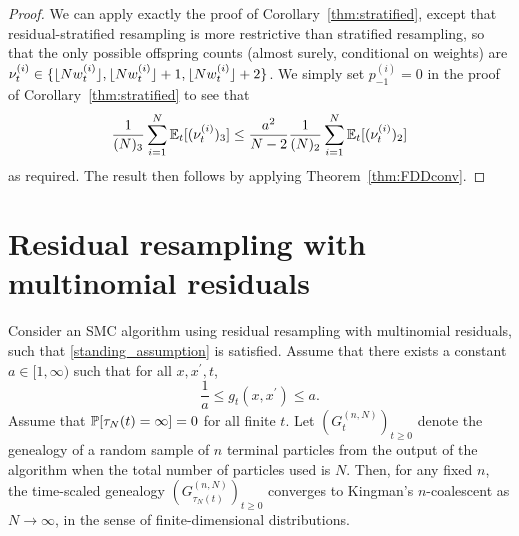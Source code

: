 \begin{proof}
We can apply exactly the proof of Corollary~\ref{thm:stratified}, except that residual-stratified resampling is more restrictive than stratified resampling, so that the only possible offspring counts (almost surely, conditional on weights) are $\nu_t^{(i)} \in \{ \lfloor N w_t^{(i)} \rfloor, \lfloor N w_t^{(i)} \rfloor +1, \lfloor N w_t^{(i)} \rfloor +2 \}$. We simply set $p_{-1}^{(i)} = 0$ in the proof of Corollary~\ref{thm:stratified} to see that
\begin{equation*}
\frac{1}{(N)_3} \sum_{i=1}^{N} \mathbb{E}_t [(\nu_t^{(i)})_3 ]
\leq \frac{a^2}{N-2} \frac{1}{(N)_2} \sum_{i=1}^{N} \mathbb{E}_t [(\nu_t^{(i)})_2 ]
\end{equation*}
as required.
The result then follows by applying Theorem~\ref{thm:FDDconv}.
\end{proof}






\section{Residual resampling with multinomial residuals \seb{$\sim$} }

\begin{corollary}\label{thm:residual_multinomial}
Consider an SMC algorithm using residual resampling with multinomial residuals, such that \ref{standing_assumption} is satisfied.
Assume that there exists a constant $a\in [1,\infty)$ such that for all $x, x^\prime, t$,
\begin{equation*}
\frac{1}{a} \leq g_t(x, x^\prime) \leq a .
\end{equation*}
Assume that $\mathbb{P}[ \tau_N(t) = \infty] =0$ for all finite $t$.
Let $(G_t^{(n,N)})_{t\geq0}$ denote the genealogy of a random sample of $n$ terminal particles from the output of the algorithm when the total number of particles used is $N$. Then, for any fixed $n$, the time-scaled genealogy $(G_{\tau_N(t)}^{(n,N)})_{t\geq0}$ converges to Kingman's $n$-coalescent as $N\to \infty$, in the sense of finite-dimensional distributions.
\end{corollary}

